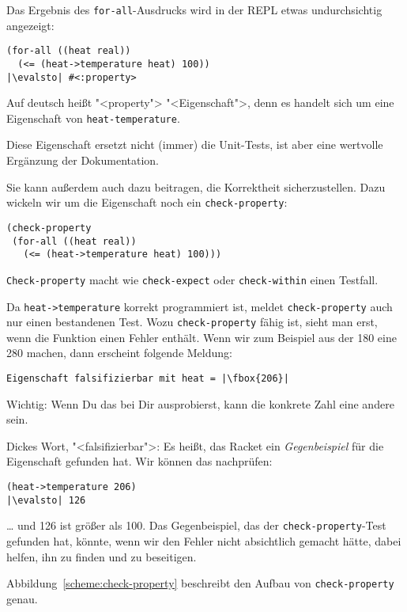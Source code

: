 Das Ergebnis des \lstinline{for-all}-Ausdrucks wird in der REPL
etwas undurchsichtig angezeigt:
%
\begin{lstlisting}
(for-all ((heat real))
  (<= (heat->temperature heat) 100))
|\evalsto| #<:property>
\end{lstlisting}
%
Auf deutsch heißt "<property"> "<Eigenschaft">, denn 
es handelt sich um eine Eigenschaft von \lstinline{heat-temperature}.  

Diese Eigenschaft ersetzt nicht (immer) die Unit-Tests, ist aber eine
wertvolle Ergänzung der Dokumentation.

Sie kann außerdem auch dazu beitragen, die Korrektheit sicherzustellen.
Dazu wickeln wir um die Eigenschaft noch ein
\lstinline{check-property}:
%
\begin{lstlisting}
(check-property
 (for-all ((heat real))
   (<= (heat->temperature heat) 100)))
\end{lstlisting}
\lstinline{Check-property} macht wie \lstinline{check-expect} oder
\lstinline{check-within} einen Testfall.

Da \lstinline{heat->temperature} korrekt programmiert ist, meldet
\lstinline{check-property} auch nur einen bestandenen Test.  Wozu
\lstinline{check-property} fähig ist, sieht man erst, wenn die
Funktion einen Fehler enthält.  Wenn wir zum Beispiel aus der 180 eine
280 machen, dann erscheint folgende Meldung:
%
\begin{lstlisting}
Eigenschaft falsifizierbar mit heat = |\fbox{206}|
\end{lstlisting}
%
Wichtig: Wenn Du das bei Dir ausprobierst, kann die konkrete Zahl
eine andere sein.

Dickes Wort, "<falsifizierbar">: Es heißt, das
Racket ein \textit{Gegenbeispiel} für die Eigenschaft gefunden hat.
Wir können das nachprüfen:
%
\begin{lstlisting}
(heat->temperature 206)
|\evalsto| 126
\end{lstlisting}
%
\ldots{} und 126 ist größer als 100.  Das Gegenbeispiel, das der
\lstinline{check-property}-Test gefunden hat, könnte, wenn wir den
Fehler nicht absichtlich gemacht hätte, dabei helfen, ihn zu finden
und zu beseitigen.

Abbildung~\ref{scheme:check-property} beschreibt den Aufbau von
\lstinline{check-property} genau.

